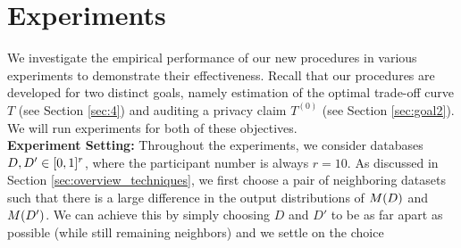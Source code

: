 

\section{Experiments} \label{sec6}
We investigate the empirical performance of our new procedures in various experiments to demonstrate their effectiveness.
Recall that our procedures are developed for two distinct goals, namely estimation of the optimal trade-off curve $T$ (see Section \ref{sec:4}) and auditing a privacy claim $T^{(0)}$ (see Section \ref{sec:goal2}). We will run experiments for both of these objectives. \\
\textbf{Experiment Setting:} 
Throughout the experiments, we consider databases $D,D' \in [0,1]^r$, where the participant number is always $r=10$. As discussed in Section \ref{sec:overview_techniques}, we first choose a pair of neighboring datasets such that there is a large difference in the output distributions of $M(D)$ and $M(D')$. We can achieve this by simply choosing $D$ and $D'$ to be as far apart as possible (while still remaining neighbors) and we settle on the choice 
